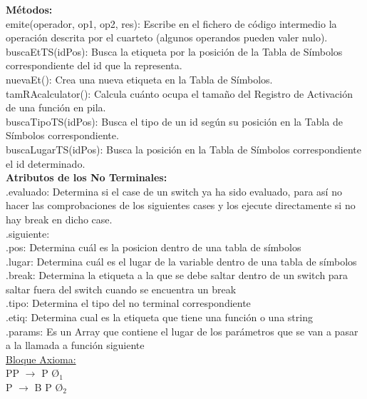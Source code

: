 \documentclass{article}[a4paper]
\newcommand\tab[1][1cm]{\hspace*{#1}}
\begin{document}
\noindent\textbf{Métodos:}\\
\tab emite(operador, op1, op2, res): Escribe en el fichero de código intermedio la operación descrita por el cuarteto (algunos operandos pueden valer nulo).\\
\tab buscaEtTS(idPos): Busca la etiqueta por la posición de la Tabla de Símbolos correspondiente del id que la representa.\\
\tab nuevaEt(): Crea una nueva etiqueta en la Tabla de Símbolos.\\
\tab tamRAcalculator(): Calcula cuánto ocupa el tamaño del Registro de Activación de una función en pila.\\
\tab buscaTipoTS(idPos): Busca el tipo de un id según su posición en la Tabla de Símbolos correspondiente.\\
\tab buscaLugarTS(idPos): Busca la posición en la Tabla de Símbolos correspondiente el id determinado.\\

\noindent\textbf{Atributos de los No Terminales:}\\
\tab .evaluado: Determina si el case de un switch ya ha sido evaluado, para así no hacer las comprobaciones de los siguientes cases y los ejecute directamente si no hay break en dicho case.\\
\tab .siguiente: \\
\tab .pos: Determina cuál es la posicion dentro de una tabla de símbolos\\
\tab .lugar: Determina cuál es el lugar de la variable dentro de una tabla de símbolos\\
\tab .break: Determina la etiqueta a la que se debe saltar dentro de un switch para saltar fuera del switch cuando se encuentra un break\\
\tab .tipo: Determina el tipo del no terminal correspondiente\\
\tab .etiq: Determina cual es la etiqueta que tiene una función o una string\\
\tab .params: Es un Array que contiene el lugar de los parámetros que se van a pasar a la llamada a función siguiente\\

\noindent\underline{Bloque Axioma:}\\

\tab PP $\rightarrow$ P \textcolor{OliveGreen}{$ $\lbrace$Ø$\rbrace$_{1}$}\\

\tab P $\rightarrow$ B P \textcolor{OliveGreen}{$ $\lbrace$Ø$\rbrace$_{2}$}\\
\end{document}
